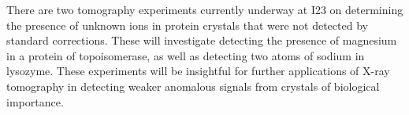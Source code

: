 There are two tomography experiments currently underway at I23 on determining the presence of unknown ions in protein crystals that were not detected by standard corrections. These will investigate detecting the presence of magnesium in a protein of topoisomerase, as well as detecting two atoms of sodium in lysozyme. These experiments will be insightful for further applications of X-ray tomography in detecting weaker anomalous signals from crystals of biological importance.

